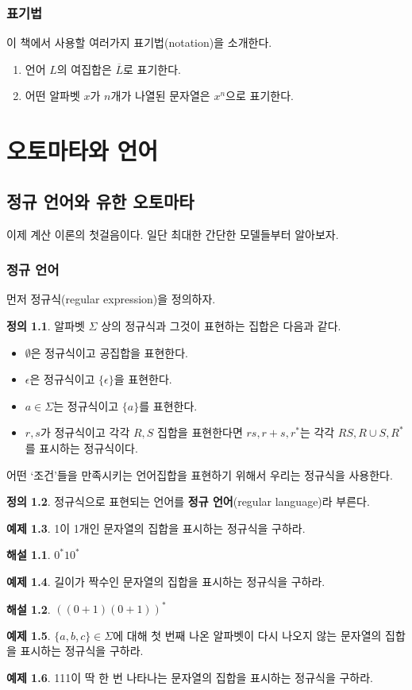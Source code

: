 \documentclass[b5paper, 11pt]{book}
\theoremstyle{definition}
\newtheorem{defn}{정의}[chapter]
\newtheorem{ex}[defn]{예제}
\newtheorem*{ans*}{해설}
\begin{document}
\section{표기법}
이 책에서 사용할 여러가지 표기법(notation)을 소개한다.
\begin{enumerate}
    \item 언어 $L$의 여집합은 $\overline{L}$로 표기한다.
    \item 어떤 알파벳 $x$가 $n$개가 나열된 문자열은 $x^n$으로 표기한다.
\end{enumerate}
\part{오토마타와 언어}
\chapter{정규 언어와 유한 오토마타} 
이제 계산 이론의 첫걸음이다. 일단 최대한 간단한 모델들부터 알아보자.
\section{정규 언어}
먼저 정규식(regular expression)을 정의하자.
\begin{defn}\label{regldefn}
    알파벳 $\Sigma$ 상의 정규식과 그것이 표현하는 집합은 다음과 같다.
\begin{itemize}
    \item $\emptyset$은 정규식이고 공집합을 표현한다.
    \item $\epsilon$은 정규식이고 $\{\epsilon\}$을 표현한다.
    \item $a \in \Sigma$는 정규식이고 $\{a\}$를 표현한다.
    \item $r, s$가 정규식이고 각각 $R, S$ 집합을 표현한다면 $rs, r+s, r^*$는 각각 $RS, R\cup S, R^* $ 를 표시하는 정규식이다. 
\end{itemize}
\end{defn}
어떤 `조건'들을 만족시키는 언어집합을 표현하기 위해서 우리는 정규식을 사용한다.
\begin{defn}
정규식으로 표현되는 언어를 \textbf{정규 언어}(regular language)라 부른다.
\end{defn}
\begin{ex}
    1이 1개인 문자열의 집합을 표시하는 정규식을 구하라.
\end{ex}
\begin{ans*}
    $0^* 1 0^*$
\end{ans*}
\begin{ex}
  길이가 짝수인 문자열의 집합을 표시하는 정규식을 구하라.
\end{ex} 
\begin{ans*}
    $((0+1)(0+1))^*$
\end{ans*}
\begin{ex}
$\{a, b, c\} \in \Sigma$에 대해 첫 번째 나온 알파벳이 다시 나오지 않는 문자열의 집합을 표시하는 정규식을 구하라.
\end{ex}
\begin{ex}
111이 딱 한 번 나타나는 문자열의 집합을 표시하는 정규식을 구하라.
\end{ex}
\end{document}
